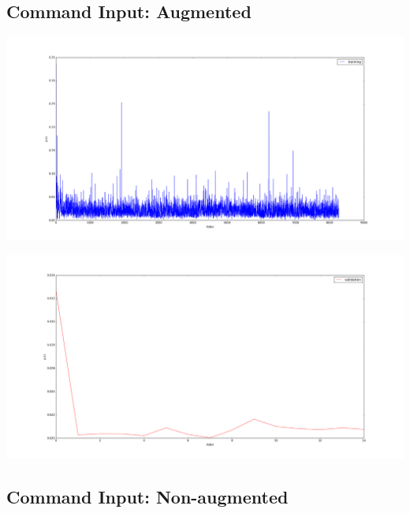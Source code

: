 \documentclass[a4paper]{article}
\begin{document}
\subsection{Command Input: Augmented}


\begin{minipage}{0.45\textwidth}
\includegraphics[width=\textwidth]{../pics/command_input_training_augmented.png}
\end{minipage}
\begin{minipage}{0.45\textwidth}
\includegraphics[width=\textwidth]{../pics/command_input_validation_augmented.png}
\end{minipage}




\subsection{Command Input: Non-augmented}
\end{document}
